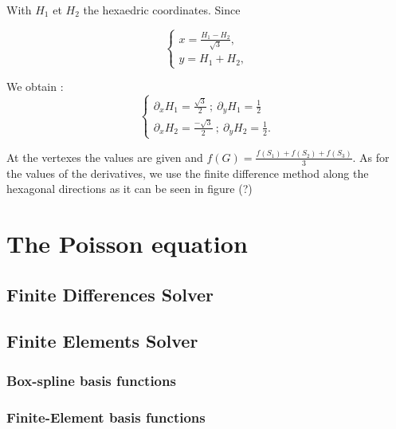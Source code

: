 \documentclass[proc]{edpsmath}
\begin{document}
With $H_1$ et $H_2$ the  hexaedric coordinates. Since   

\begin{equation}
\begin{cases}  

\displaystyle{x = \frac{ H_1 - H_2 }{\sqrt{3}} },  \\[2mm]
\displaystyle{y =  H_1 + H_2 },        

\end{cases}
\end{equation}

We obtain :
\begin{equation}
	\begin{cases}  
       \displaystyle{  \partial _x H_1 = \frac{\sqrt{3}}{ 2} ~;~  \partial _y H_1 = \frac{1}{ 2}  }\\[2mm]
       \displaystyle{  \partial _x H_2 = \frac{-\sqrt{3}}{2} ~;~  \partial _y H_2 = \frac{1}{ 2}  } . 
\end{cases}	
\end{equation}

At the vertexes the values are given and $f(G) = \frac{f(S_1)+f(S_2)+f(S_3)}{3}$. As for the values of the derivatives, we use the finite difference method along the hexagonal directions as it can be seen in figure (?)


\section{The Poisson equation}
\label{sec:poisson_eqn}
\subsection{Finite Differences Solver}
\subsection{Finite Elements Solver}
\subsubsection{Box-spline basis functions}
\subsubsection{Finite-Element basis functions}
\end{document}
